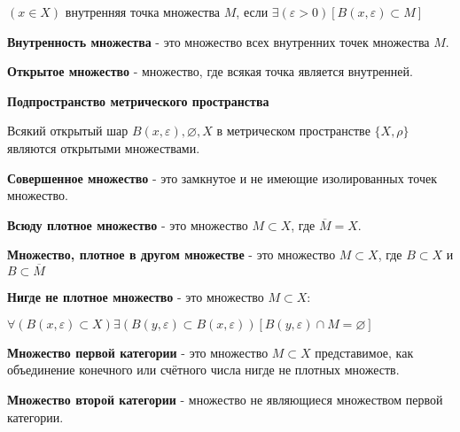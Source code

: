 $(x \in X)$ внутренняя точка множества $M$, если $\exists(\varepsilon>0)[B(x, \varepsilon)\subset M]$

\textbf{Внутренность множества} - это множество всех внутренних точек множества $M$.

\textbf{Открытое множество} - множество, где всякая точка является внутренней.

\textbf{Подпространство метрического пространства}

Всякий открытый шар $B(x, \varepsilon), \varnothing, X $ в метрическом пространстве $\{X, \rho \}$ являются открытыми множествами. 

\textbf{Совершенное множество} - это замкнутое и не имеющие изолированных точек множество.

\textbf{Всюду плотное множество} - это множество  $ M \subset X$, где $ \overline{M}=X$.

\textbf{Множество, плотное в другом множестве} - это множество $ M \subset X$, где $ B \subset X$ и $B \subset \overline{M}$

\textbf{Нигде не плотное множество}  - это множество $ M \subset X$:

$\forall(B(x, \varepsilon) \subset X) \exists(B(y, \varepsilon) \subset B(x, \varepsilon))[B(y, \varepsilon)\cap M=\varnothing]$

\textbf{Множество первой категории} - это множество $M \subset X$ представимое, как объединение конечного или счётного числа нигде не плотных множеств.

\textbf{Множество второй категории} - множество не являющиеся множеством первой категории.
